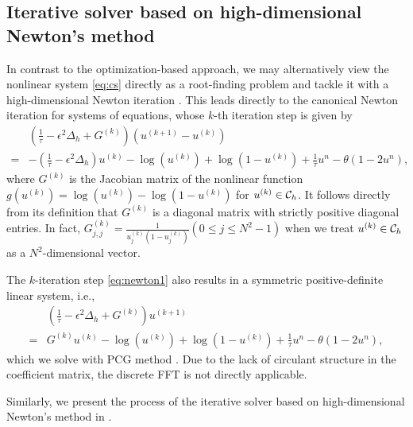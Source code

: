 \subsection{Iterative solver based on high-dimensional Newton's method}
In contrast to the optimization-based approach, we may alternatively view the nonlinear system \eqref{eq:cs} directly as a root-finding problem 
and tackle it with a high-dimensional Newton iteration \cite{ortega2000iterative}. 
This leads directly to the canonical Newton iteration for systems of equations, whose $k$-th iteration step is given by
\begin{equation}\label{eq:newton1}
    \begin{aligned}
    &(\frac{1}{\tau}-\epsilon^2\Delta_h+G^{(k)})(u^{(k+1)}-u^{(k)})\\
    =&-(\frac{1}{\tau}-\epsilon^2\Delta_h)u^{(k)}-\log(u^{(k)})
    +\log(1-u^{(k)})
    +\frac{1}{\tau}u^n-\theta(1-2u^n),
\end{aligned}
\end{equation}
where $G^{(k)}$ is the Jacobian matrix of the nonlinear function $g(u^{(k)})=\log(u^{(k)})-\log(1-u^{(k)})$ for $u^{(k)}\in {\mathcal{C}_h}$. 
It follows directly from its definition that $G^{(k)}$ is a diagonal matrix with strictly positive diagonal entries. 
In fact, $G^{(k)}_{j,j}=\frac{1}{u_{j}^{(k)}(1-u_{j}^{(k)})}(0\leq j \leq N^2-1)$ when we treat $u^{(k)} \in {\mathcal{C}_h}$ as a $N^2$-dimensional vector.
\par The $k$-iteration step \eqref{eq:newton1} also results in a symmetric positive-definite linear system, i.e.,
\begin{equation}
\begin{aligned}
    &(\frac{1}{\tau}-\epsilon^2\Delta_h+G^{(k)})u^{(k+1)}\\
    =&G^{(k)}u^{(k)}
    -\log(u^{(k)})
    +\log(1-u^{(k)})
    +\frac{1}{\tau}u^n-\theta(1-2u^n),
\end{aligned}
\end{equation}
which we solve with PCG method \cite{concus1976generalized}. Due to the lack of circulant structure in the coefficient matrix, the discrete FFT is not directly applicable. 
\par Similarly, we present the process of the iterative solver based on high-dimensional Newton's method in .

